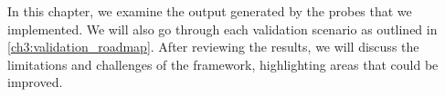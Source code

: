 In this chapter, we examine the output generated by the probes that we implemented. We will also go through each validation scenario as outlined in \autoref{ch3:validation_roadmap}. After reviewing the results, we will discuss the limitations and challenges of the framework, highlighting areas that could be improved.